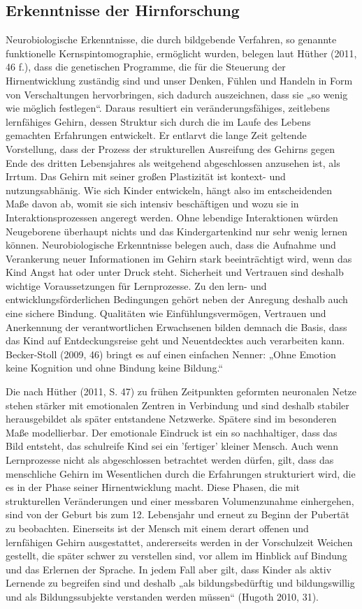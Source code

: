 \subsection{Erkenntnisse der Hirnforschung}
Neurobiologische Erkenntnisse, die durch bildgebende Verfahren, so genannte funktionelle Kernspintomographie, ermöglicht wurden,
belegen laut Hüther (2011, 46 f.), dass die genetischen Programme, die für die Steuerung der Hirnentwicklung zuständig sind und unser Denken, Fühlen und Handeln in Form von Verschaltungen hervorbringen, sich dadurch auszeichnen, dass sie „so wenig wie möglich festlegen“. Daraus resultiert ein veränderungsfähiges, zeitlebens lernfähiges Gehirn, dessen Struktur sich durch die im Laufe des Lebens gemachten Erfahrungen entwickelt. Er entlarvt die lange Zeit geltende Vorstellung, dass der Prozess der strukturellen Ausreifung des Gehirns gegen Ende des dritten Lebensjahres als weitgehend abgeschlossen anzusehen ist, als Irrtum. Das Gehirn mit seiner großen Plastizität ist kontext- und nutzungsabhänig. Wie sich Kinder entwickeln, hängt also im entscheidenden Maße davon ab, womit sie sich intensiv beschäftigen und wozu sie in Interaktionsprozessen angeregt werden. Ohne lebendige Interaktionen würden Neugeborene überhaupt nichts und das Kindergartenkind nur sehr wenig lernen können. Neurobiologische Erkenntnisse belegen auch, dass die Aufnahme und Verankerung neuer Informationen im Gehirn stark beeinträchtigt wird, wenn das Kind Angst hat oder unter Druck steht. Sicherheit und Vertrauen sind deshalb wichtige Voraussetzungen für Lernprozesse. Zu den lern- und entwicklungsförderlichen Bedingungen gehört neben der Anregung deshalb 
auch eine sichere Bindung. Qualitäten wie Einfühlungsvermögen, Vertrauen und Anerkennung der verantwortlichen Erwachsenen bilden demnach die Basis, dass das Kind auf Entdeckungsreise geht und Neuentdecktes auch verarbeiten kann.
Becker-Stoll (2009, 46) bringt es auf einen einfachen Nenner: „Ohne Emotion keine Kognition und ohne Bindung keine Bildung.“

Die nach Hüther (2011, S. 47) zu frühen Zeitpunkten geformten neuronalen Netze stehen stärker mit emotionalen Zentren in Verbindung und sind deshalb stabiler herausgebildet als später entstandene Netzwerke. Spätere sind im besonderen Maße modellierbar.
Der emotionale Eindruck ist ein so nachhaltiger, dass das Bild entsteht, das schulreife Kind sei ein ’fertiger' kleiner Mensch. Auch wenn Lernprozesse nicht als abgeschlossen betrachtet werden dürfen, gilt, dass das menschliche Gehirn im Wesentlichen durch die Erfahrungen strukturiert wird, die es in der Phase seiner Hirnentwicklung macht. 
Diese Phasen, die mit strukturellen Veränderungen und einer messbaren Volumenzunahme einhergehen, sind von der Geburt bis zum 12. Lebensjahr und erneut zu Beginn der Pubertät zu beobachten. 
Einerseits ist der Mensch mit einem derart offenen und lernfähigen Gehirn ausgestattet, andererseits werden in der Vorschulzeit Weichen gestellt, die später schwer zu verstellen sind, vor allem im Hinblick auf Bindung und das Erlernen der Sprache.
In jedem Fall aber gilt, dass Kinder als aktiv Lernende zu begreifen sind und deshalb „als bildungsbedürftig und bildungswillig und als Bildungssubjekte verstanden werden müssen“ (Hugoth 2010, 31).
 

